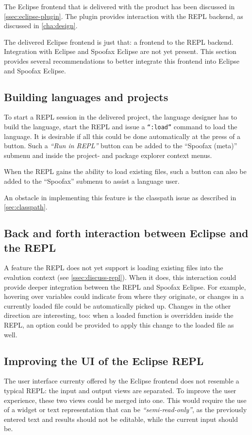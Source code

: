 The Eclipse frontend that is delivered with the product has been discussed in
\cref{ssec:eclipse-plugin}. The plugin provides interaction with the REPL
backend, as discussed in \cref{cha:design}.

The delivered Eclipse frontend is just that: a frontend to the REPL backend.
Integration with Eclipse and Spoofax Eclipse are not yet present. This
section provides several recommendations to better integrate this frontend
into Eclipse and Spoofax Eclipse.

\subsection{Building languages and projects}

To start a REPL session in the delivered project, the language designer has to
build the language, start the REPL and issue a \texttt{``:load''} command to
load the language. It is desirable if all this could be done automatically at
the press of a button. Such a \textit{``Run in REPL''} button can be added to the
``Spoofax (meta)'' submenu and inside the project- and package explorer context
menus.

When the REPL gains the ability to load existing files, such a button can also
be added to the ``Spoofax'' submenu to assist a language user.

An obstacle in implementing this feature is the classpath issue as described in
\cref{sec:classpath}.

\subsection{Back and forth interaction between Eclipse and the REPL}

A feature the REPL does not yet support is loading existing files into the
evalution context (see \cref{ssec:discuss-repl}). When it does, this interaction
could provide deeper integration between the REPL and Spoofax Eclipse. For
example, hovering over variables could indicate from where they originate, or
changes in a currently loaded file could be automatically picked up. Changes in
the other direction are interesting, too: when a loaded function is overridden
inside the REPL, an option could be provided to apply this change to the loaded
file as well.

\subsection{Improving the UI of the Eclipse REPL}

The user interface currenty offered by the Eclipse frontend does not resemble a
typical REPL: the input and output views are separated. To improve the user
experience, these two views could be merged into one. This would require the use
of a widget or text representation that can be \textit{``semi-read-only''}, as
the previously entered text and results should not be editable, while the
current input should be.

